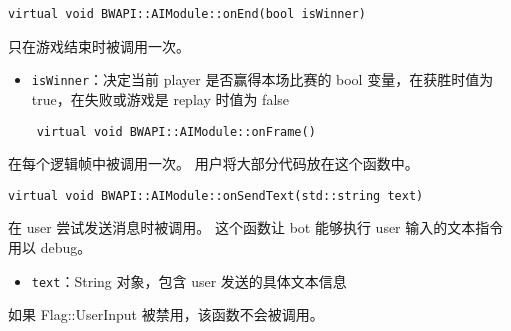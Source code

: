\begin{tcolorbox}[colback=white, colframe=black!60!white, title=onEnd(), arc=0mm]
\begin{verbatim}
virtual void BWAPI::AIModule::onEnd(bool isWinner)
\end{verbatim}
只在游戏结束时被调用一次。
\begin{parameter}
    \begin{itemize}
        \item \texttt{isWinner}：决定当前 player 是否赢得本场比赛的 bool 变量，在获胜时值为 true，在失败或游戏是 replay 时值为 false
    \end{itemize}
\end{parameter}
\end{tcolorbox}

\begin{tcolorbox}[colback=white, colframe=black!60!white, title=onFrame(), arc=0mm]
    \begin{verbatim}
    virtual void BWAPI::AIModule::onFrame()
    \end{verbatim}
    在每个逻辑帧中被调用一次。  
    用户将大部分代码放在这个函数中。
\end{tcolorbox}
    

\begin{tcolorbox}[colback=white, colframe=black!60!white, title=onSendText(), arc=0mm]
\begin{verbatim}
virtual void BWAPI::AIModule::onSendText(std::string text)
\end{verbatim}
在 user 尝试发送消息时被调用。  
这个函数让 bot 能够执行 user 输入的文本指令用以 debug。
\begin{parameter}
    \begin{itemize}
        \item \texttt{text}：String 对象，包含 user 发送的具体文本信息
    \end{itemize}
\end{parameter}
\begin{note}
    如果 Flag::UserInput 被禁用，该函数不会被调用。
\end{note}
\end{tcolorbox}

